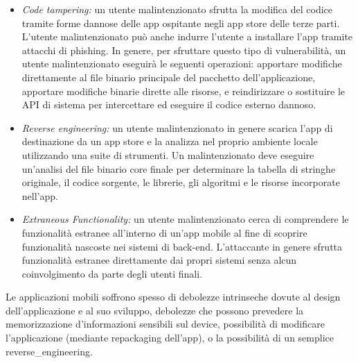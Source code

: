 \begin{itemize}
    \item \textit{Code tampering:}
     un utente malintenzionato sfrutta la modifica del codice tramite forme dannose delle app ospitante negli app store delle terze parti.
    L'utente malintenzionato può anche indurre l'utente a installare l'app tramite attacchi di phishing.
    In genere, per sfruttare questo tipo di vulnerabilità, un utente malintenzionato eseguirà le seguenti operazioni: apportare modifiche direttamente al file binario principale del pacchetto dell'applicazione, apportare modifiche binarie dirette alle risorse, e reindirizzare o sostituire le API di sistema per intercettare ed eseguire il codice esterno dannoso.

    \item \textit{Reverse engineering:}
    un utente malintenzionato in genere scarica l'app di destinazione da un app store e la analizza nel proprio ambiente locale utilizzando una suite di strumenti.
    Un malintenzionato deve eseguire un'analisi del file binario core finale per determinare la tabella di stringhe originale, il codice sorgente, le librerie, gli algoritmi e le risorse incorporate nell'app.
    \item \textit{Extraneous Functionality:}
    un utente malintenzionato cerca di comprendere le funzionalità estranee all'interno di un'app mobile  al fine di scoprire funzionalità nascoste nei sistemi di back-end.
    L'attaccante in genere sfrutta funzionalità estranee direttamente dai propri sistemi senza alcun coinvolgimento da parte degli utenti finali.
\end{itemize}
Le applicazioni mobili soffrono spesso di debolezze intrinseche dovute al design dell'applicazione e al suo sviluppo, debolezze che possono prevedere la memorizzazione d'informazioni sensibili sul device, possibilità di modificare l'applicazione (mediante \gls{repackaging} dell'app), o la possibilità di un semplice \gls{reverse_engineering}.